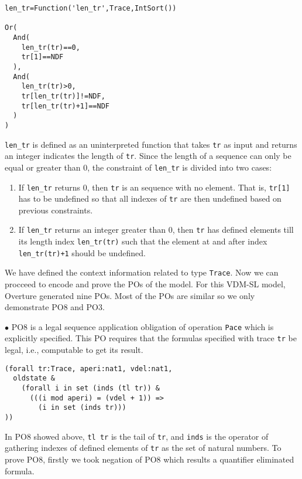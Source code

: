 \begin{mdframed}[roundcorner=5pt,shadow=true]
\begin{Verbatim}[fontsize=\small]
len_tr=Function('len_tr',Trace,IntSort())

Or(
  And(
    len_tr(tr)==0,
    tr[1]==NDF
  ),
  And(
    len_tr(tr)>0,
    tr[len_tr(tr)]!=NDF,
    tr[len_tr(tr)+1]==NDF
  )
)
\end{Verbatim}
\end{mdframed}

{\tt len\_tr} is defined as an uninterpreted function that takes {\tt tr} as input and returns an integer indicates the length of {\tt tr}. Since the length of a sequence can only be equal or greater than 0, the constraint of {\tt len\_tr} is divided into two cases:

\begin{enumerate}
\item
If {\tt len\_tr} returns 0, then {\tt tr} is an sequence with no element. That is, {\tt tr[1]} has to be undefined so that all indexes of {\tt tr} are then undefined based on previous constraints.
\item
If {\tt len\_tr} returns an integer greater than 0, then {\tt tr} has defined elements till its length index {\tt len\_tr(tr)} such that the element at and after index {\tt len\_tr(tr)+1} should be undefined.
\end{enumerate}

We have defined the context information related to type {\tt Trace}. Now we can procceed to encode and prove the POs of the model. For this VDM-SL model, Overture generated nine POs. Most of the POs are similar so we only demonstrate PO8 and PO3.

$\bullet$ PO8 is a legal sequence application obligation of operation {\tt Pace} which is explicitly specified. This PO requires that the formulas specified with trace {\tt tr} be legal, i.e., computable to get its result.

\begin{mdframed}[roundcorner=5pt]
\begin{Verbatim}[fontsize=\small]
(forall tr:Trace, aperi:nat1, vdel:nat1,
  oldstate & 
    (forall i in set (inds (tl tr)) &
      (((i mod aperi) = (vdel + 1)) =>
        (i in set (inds tr)))
))
\end{Verbatim}
\end{mdframed}

In PO8 showed above, {\tt tl tr} is the tail of {\tt tr}, and {\tt inds} is the operator of gathering indexes of defined elements of {\tt tr} as the set of natural numbers. To prove PO8, firstly we took negation of PO8 which results a quantifier eliminated formula.

